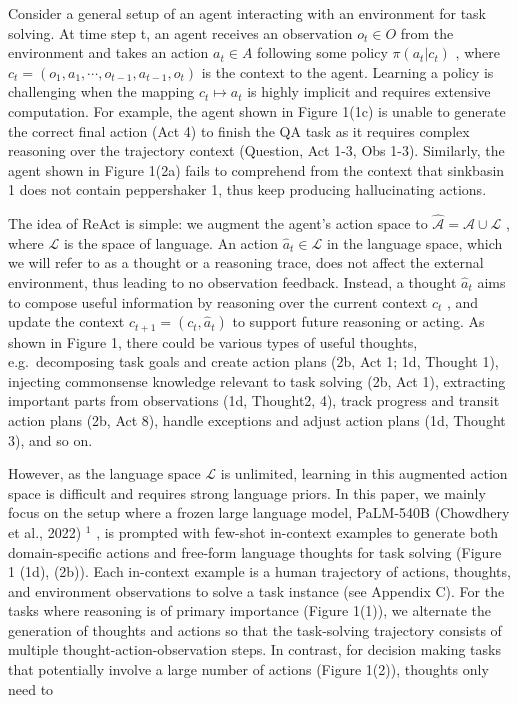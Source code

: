 \documentclass[
]{article}
\begin{document}
Consider a general setup of an agent interacting with an environment for
task solving. At time step t, an agent receives an observation
\(o_{t} \in O\) from the environment and takes an action \(a_{t} \in A\)
following some policy \(\pi(a_{t}|c_{t})\) , where
\(c_{t} = (o_{1}, a_{1}, \cdots, o_{t-1}, a_{t-1}, o_{t})\) is the
context to the agent. Learning a policy is challenging when the mapping
\(c_{t} \mapsto a_{t}\) is highly implicit and requires extensive
computation. For example, the agent shown in Figure 1(1c) is unable to
generate the correct final action (Act 4) to finish the QA task as it
requires complex reasoning over the trajectory context (Question, Act
1-3, Obs 1-3). Similarly, the agent shown in Figure 1(2a) fails to
comprehend from the context that sinkbasin 1 does not contain
peppershaker 1, thus keep producing hallucinating actions.

The idea of ReAct is simple: we augment the agent's action space to
\(\hat{\mathcal{A}} = \mathcal{A} \cup \mathcal{L}\) , where
\(\mathcal{L}\) is the space of language. An action
\(\hat{a}_t \in \mathcal{L}\) in the language space, which we will refer
to as a thought or a reasoning trace, does not affect the external
environment, thus leading to no observation feedback. Instead, a thought
\(\hat{a}_t\) aims to compose useful information by reasoning over the
current context \(c_t\) , and update the context
\(c_{t+1} = (c_t, \hat{a}_t)\) to support future reasoning or acting. As
shown in Figure 1, there could be various types of useful thoughts,
e.g.~decomposing task goals and create action plans (2b, Act 1; 1d,
Thought 1), injecting commonsense knowledge relevant to task solving
(2b, Act 1), extracting important parts from observations (1d, Thought2,
4), track progress and transit action plans (2b, Act 8), handle
exceptions and adjust action plans (1d, Thought 3), and so on.

However, as the language space \(\mathcal{L}\) is unlimited, learning in
this augmented action space is difficult and requires strong language
priors. In this paper, we mainly focus on the setup where a frozen large
language model, PaLM-540B (Chowdhery et al., 2022) \(^{1}\) , is
prompted with few-shot in-context examples to generate both
domain-specific actions and free-form language thoughts for task solving
(Figure 1 (1d), (2b)). Each in-context example is a human trajectory of
actions, thoughts, and environment observations to solve a task instance
(see Appendix C). For the tasks where reasoning is of primary importance
(Figure 1(1)), we alternate the generation of thoughts and actions so
that the task-solving trajectory consists of multiple
thought-action-observation steps. In contrast, for decision making tasks
that potentially involve a large number of actions (Figure 1(2)),
thoughts only need to
\end{document}
